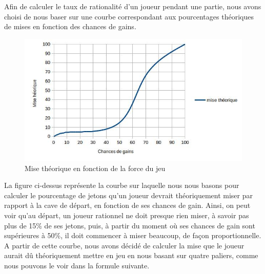 \documentclass{report}
\begin{document}
\hspace{0.5cm}Afin de calculer le taux de rationalité d'un joueur pendant une partie, nous avons choisi de nous baser sur une courbe correspondant aux pourcentages théoriques de mises en fonction des chances de gains. 

\begin{figure}[H]
	\begin{center}
		\includegraphics[scale=0.5]{./imagesRapport/courbeRationaliteMiseTheorique.jpg}
	\end{center}
	\caption[Mise théorique en fonction de la force du jeu]{Mise théorique en fonction de la force du jeu}
\end{figure}

La figure ci-dessus représente la courbe sur laquelle nous nous basons pour calculer le pourcentage de jetons qu'un joueur devrait théoriquement miser par rapport à la cave de départ, en fonction de ses chances de gain. Ainsi, on peut voir qu'au départ, un joueur rationnel ne doit presque rien miser, à savoir pas plus de 15\% de ses jetons, puis, à partir du moment où ses chances de gain sont supérieures à 50\%, il doit commencer à miser beaucoup, de façon proportionnelle.\\

A partir de cette courbe, nous avons décidé de calculer la mise que le joueur aurait dû théoriquement mettre en jeu en nous basant sur quatre paliers, comme nous pouvons le voir dans la formule suivante. \\
\end{document}

